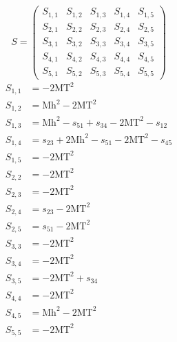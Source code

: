 \documentclass[a4paper]{article}
\begin{document}
\begin{equation}
S=\left(\begin{array}{ccccc}
   S_{1,1}&
   S_{1,2}&
   S_{1,3}&
   S_{1,4}&
   S_{1,5}\\
   S_{2,1}&
   S_{2,2}&
   S_{2,3}&
   S_{2,4}&
   S_{2,5}\\
   S_{3,1}&
   S_{3,2}&
   S_{3,3}&
   S_{3,4}&
   S_{3,5}\\
   S_{4,1}&
   S_{4,2}&
   S_{4,3}&
   S_{4,4}&
   S_{4,5}\\
   S_{5,1}&
   S_{5,2}&
   S_{5,3}&
   S_{5,4}&
   S_{5,5}\end{array}\right)
\end{equation}
\begin{subequations}
\begin{align}
   S_{1,1}&=-2\text{MT}^2\\
   S_{1,2}&=\text{Mh}^2-2\text{MT}^2\\
   S_{1,3}&=\text{Mh}^2-s_{51}+s_{34}-2\text{MT}^2-s_{12}\\
   S_{1,4}&=s_{23}+2\text{Mh}^2-s_{51}-2\text{MT}^2-s_{45}\\
   S_{1,5}&=-2\text{MT}^2\\
   S_{2,2}&=-2\text{MT}^2\\
   S_{2,3}&=-2\text{MT}^2\\
   S_{2,4}&=s_{23}-2\text{MT}^2\\
   S_{2,5}&=s_{51}-2\text{MT}^2\\
   S_{3,3}&=-2\text{MT}^2\\
   S_{3,4}&=-2\text{MT}^2\\
   S_{3,5}&=-2\text{MT}^2+s_{34}\\
   S_{4,4}&=-2\text{MT}^2\\
   S_{4,5}&=\text{Mh}^2-2\text{MT}^2\\
   S_{5,5}&=-2\text{MT}^2
\end{align}
\end{subequations}
\end{document}
